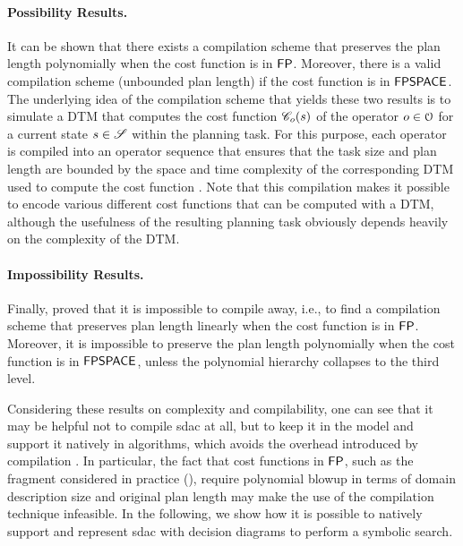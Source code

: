\paragraph{Possibility Results.}  It can be shown that there exists a compilation scheme that preserves the plan length polynomially when the cost function is in $\mathsf{FP}$.
Moreover, there is a valid compilation scheme (unbounded plan length) if the cost function is in $\mathsf{FPSPACE}$.
The underlying idea of the compilation scheme that yields these two results is to simulate a DTM that computes the cost function $\mathscr C_o(s)$ of the operator $o \in \mathcal O$ for a current state $s \in \mathscr S$ within the planning task.
For this purpose, each operator is compiled into an operator sequence that ensures that the task size and plan length are bounded by the space and time complexity of the corresponding DTM used to compute the cost function \autocite{speck-et-al-icaps2021}.
Note that this compilation makes it possible to encode various different cost functions that can be computed with a DTM, although the usefulness of the resulting planning task obviously depends heavily on the complexity of the DTM.

\paragraph{Impossibility Results.} Finally, \textcite{speck-et-al-icaps2021} proved that it is impossible to compile away, i.e., to find a compilation scheme that preserves plan length linearly when the cost function is in $\mathsf{FP}$. Moreover, it is impossible to preserve the plan length polynomially when the cost function is in $\mathsf{FPSPACE}$, unless the polynomial hierarchy collapses to the third level.

\medskip
Considering these results on complexity and compilability, one can see that it may be helpful not to compile sdac at all, but to keep it in the model and support it natively in algorithms, which avoids the overhead introduced by compilation \autocite{speck-et-al-icaps2021}.
In particular, the fact that cost functions in $\mathsf{FP}$, such as the fragment considered in practice (), require polynomial blowup in terms of domain description size and original plan length may make the use of the compilation technique infeasible.
In the following, we show how it is possible to natively support and represent sdac with decision diagrams to perform a symbolic search.

